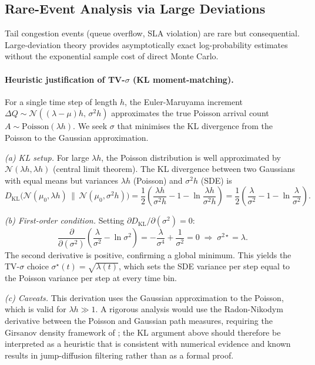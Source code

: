 \documentclass[journal]{IEEEtran}
\begin{document}
\subsection{Rare-Event Analysis via Large Deviations}
\label{subsec:rare_event}

Tail congestion events (queue overflow, SLA violation) are rare but consequential.
Large-deviation theory provides asymptotically exact log-probability estimates without the
exponential sample cost of direct Monte Carlo.

\paragraph{Heuristic justification of TV-$\sigma$ (KL moment-matching).}
For a single time step of length $h$, the Euler-Maruyama increment
$\Delta Q \sim \mathcal{N}((\lambda-\mu)h,\,\sigma^2 h)$ approximates the true Poisson
arrival count $A \sim \mathrm{Poisson}(\lambda h)$.  We seek $\sigma$ that minimises the
KL divergence from the Poisson to the Gaussian approximation.

\textit{(a) KL setup.}  For large $\lambda h$, the Poisson distribution is well approximated
by $\mathcal{N}(\lambda h,\lambda h)$ (central limit theorem).  The KL divergence between
two Gaussians with equal means but variances $\lambda h$ (Poisson) and $\sigma^2 h$
(SDE) is
\[
    D_{\mathrm{KL}}\!\bigl(\mathcal{N}(\mu_0,\lambda h)\,\|\,
    \mathcal{N}(\mu_0,\sigma^2 h)\bigr)
    =\frac{1}{2}\!\left(\frac{\lambda h}{\sigma^2 h}-1-\ln\frac{\lambda h}{\sigma^2 h}\right)
    =\frac{1}{2}\!\left(\frac{\lambda}{\sigma^2}-1-\ln\frac{\lambda}{\sigma^2}\right).
\]

\textit{(b) First-order condition.}  Setting $\partial D_{\mathrm{KL}}/\partial(\sigma^2)=0$:
\[
    \frac{\partial}{\partial(\sigma^2)}\!\left(\frac{\lambda}{\sigma^2}-\ln\sigma^2\right)
    =-\frac{\lambda}{\sigma^4}+\frac{1}{\sigma^2}=0
    \;\Longrightarrow\; \sigma^{2\star}=\lambda.
\]
The second derivative is positive, confirming a global minimum.  This yields the
TV-$\sigma$ choice $\sigma^\star(t)=\sqrt{\lambda(t)}$, which sets the SDE variance per
step equal to the Poisson variance per step at every time bin.

\textit{(c) Caveats.}  This derivation uses the Gaussian approximation to the Poisson,
which is valid for $\lambda h \gg 1$.  A rigorous analysis would use the Radon-Nikodym
derivative between the Poisson and Gaussian path measures, requiring the Girsanov
density framework of \cite{kabanov1978,liptser2001statistics}; the KL argument above
should therefore be interpreted as a heuristic that is consistent with numerical evidence
and known results in jump-diffusion filtering rather than as a formal proof.
\end{document}
